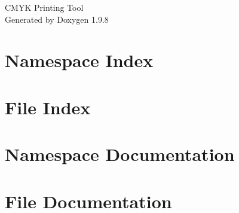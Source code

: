 \documentclass[twoside]{book}
\newcommand{\+}{\discretionary{\mbox{\scriptsize$\hookleftarrow$}}{}{}}
\newcommand{\clearemptydoublepage}{%
    \newpage{\pagestyle{empty}\cleardoublepage}%
  }
\begin{document}
  \raggedbottom
    \hypersetup{pageanchor=false,
                bookmarksnumbered=true,
                pdfencoding=unicode
               }
  \begin{titlepage}
  \vspace*{7cm}
  \begin{center}%
  {\Large CMYK Printing Tool}\\
  \vspace*{1cm}
  {\large Generated by Doxygen 1.9.8}\\
  \end{center}
  \end{titlepage}
  \clearemptydoublepage
  \tableofcontents
  \clearemptydoublepage
  \hypersetup{pageanchor=true}
\chapter{Namespace Index}

\chapter{File Index}

\chapter{Namespace Documentation}

\chapter{File Documentation}

  \backmatter
  \newpage
  \clearemptydoublepage
  \printindex
\end{document}
